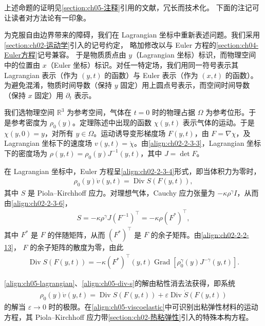 \documentclass[../../main.tex]{subfiles}
\begin{document}
上述命题的证明见\cref{section:ch05-注释}引用的文献，冗长而技术化。
下面的注记可让读者对方法论有一印象。

为克服自由边界带来的障碍，我们在 Lagrangian 坐标中重新表述问题。我们采用\cref{section:ch02-运动学}引入的记号约定，
略加修改以与 Euler 方程的\cref{section:ch04-Euler方程}记号兼容。
于是物质质点由 $y$（Lagrangian 坐标）标识，而物理空间中的位置由 $x$（Euler 坐标）标识。对任一特定场，我们用同一符号表示其 Lagrangian 表示（作为 $(y,t)$ 的函数）与 Euler 表示（作为 $(x,t)$ 的函数）。为避免混淆，物质时间导数（保持 $y$ 固定）用上圆点号表示，而空间时间导数（保持 $x$ 固定）用 $\partial_{t}$ 表示。

我们选物理空间 $\mathbb{R}^{3}$ 为参考空间，气体在 $t=0$ 时的物理占据 $\Omega$ 为参考位形。于是参考密度为 $\rho_{0}(y)$。定理陈述中出现的函数 $\chi(y,t)$ 表示气体的运动。于是 $\chi(y,0)=y$，对所有 $y\in\Omega$。运动诱导变形梯度场 $F(y,t)$，由 $F=\nabla\chi$，及 Lagrangian 坐标下的速度场 $v(y,t)=\dot{\chi}$。由\eqref{align:ch02-2-3-3}，Lagrangian 坐标下的密度场为 $\rho(y,t)=\rho_{0}(y)J^{-1}(y,t)$，其中 $J=\det F$。

在 Lagrangian 坐标中，Euler 方程呈\eqref{align:ch02-2-3-4}形式，即当体积力为零时，
\begin{align}
\rho_{0}(y)\dot{v}(y,t)=\operatorname{Div}S(F(y,t)),\label{align:ch05-lagrangian}
\end{align}
其中 $S$ 是 Piola--Kirchhoff 应力。对理想气体，Cauchy 应力张量为 $-\kappa\rho^{\gamma}I$，从而由\eqref{align:ch02-2-3-6}，
\begin{align}
S=-\kappa\rho^{\gamma}J(F^{-1})^{\top}=-\kappa\rho(F^{*})^{\top},\label{align:ch05-pk-stress}
\end{align}
其中 $F^{*}$ 是 $F$ 的伴随矩阵，从而 $(F^{*})^{\top}$ 是 $F$ 的余子矩阵。由\eqref{align:ch02-2-2-13}，
$F$ 的余子矩阵的散度为零，由此
\begin{align}
\operatorname{Div}S(F(y,t))=-\kappa(F^{*})^{\top}(y,t)\operatorname{Grad}[\rho_{0}^{\gamma}(y)J^{-\gamma}(y,t)].\label{align:ch05-div-s}
\end{align}

\eqref{align:ch05-lagrangian}、\eqref{align:ch05-div-s}的解由粘性消去法获得，即系统
\begin{align}
\rho_{0}(y)\dot{v}(y,t)=\operatorname{Div}S(F(y,t))+\varepsilon\operatorname{Div}\dot{S}(F(y,t))\label{align:ch05-viscoelastic}
\end{align}
的解当 $\varepsilon\to0$ 时的极限。在\eqref{align:ch05-viscoelastic}中可识别出粘弹性材料的运动方程，其 Piola--Kirchhoff 应力带\cref{section:ch02-热粘弹性}引入的特殊本构方程。
\end{document}

